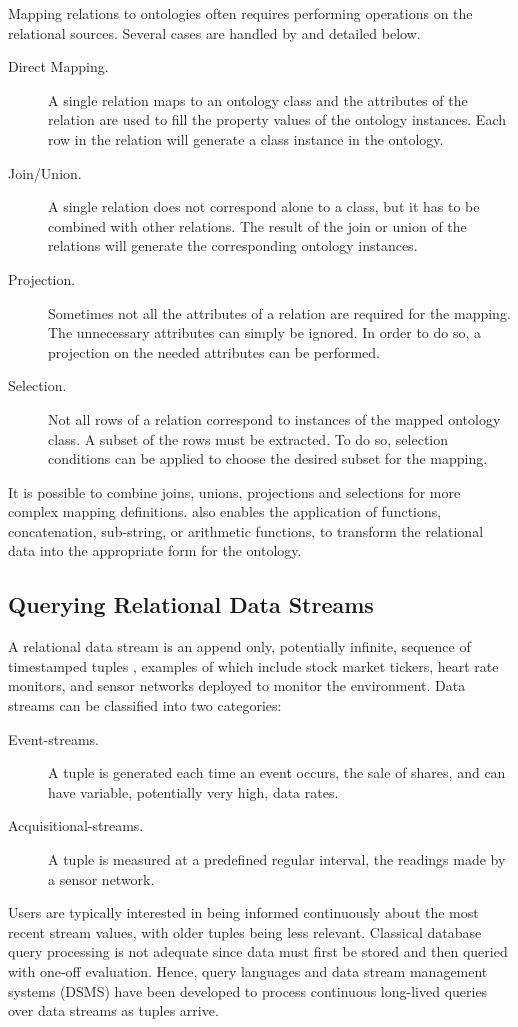 Mapping relations to ontologies often requires performing operations on the relational sources. 
Several cases are handled by \rtwoo and detailed below.
\begin{description}
\item[Direct Mapping.] A single relation maps to an ontology class and the attributes of the relation are used to fill the property values of the ontology instances. Each row in the relation will generate a class instance in the ontology.
\item[Join/Union.] A single relation does not correspond alone to a class, but it has to be combined with other relations. The result of the join or union of the relations will generate the corresponding ontology instances.
\item[Projection.] Sometimes not all the attributes of a relation are required for the mapping. The unnecessary attributes can simply be ignored. In order to do so, a projection on the needed attributes can be performed.
\item[Selection.] Not all rows of a relation correspond to instances of the mapped ontology class. A subset of the rows must be extracted. To do so, selection conditions can be applied to choose the desired subset for the mapping.
\end{description}
It is possible to combine joins, unions, projections and selections for more complex mapping definitions.
\rtwoo also enables the application of functions, \eg concatenation, sub-string, or arithmetic functions, to transform the relational data into the appropriate form for the ontology.



\subsection{Querying Relational Data Streams}
\label{sec:query-relat-streams}

A relational data stream is an append only, potentially infinite, sequence of timestamped tuples \cite{Golab2003Issues-in-data-}, examples of which include stock market tickers, heart rate monitors, and sensor networks deployed to monitor the environment.
Data streams can be classified into two categories:
\begin{description}
\item[Event-streams.] A tuple is generated each time an event occurs, \eg the sale of shares, and can have variable, potentially very high, data rates.
\item[Acquisitional-streams.] A tuple is measured at a predefined regular interval, \eg the readings made by a sensor network.
\end{description}
Users are typically interested in being informed continuously about the most recent stream values, with older tuples being less relevant.
Classical database query processing is not adequate since data must first be stored and then queried with one-off evaluation.
Hence, query languages \cite{Brenninkmeijer_08,Arasu_2006} and data stream management systems (DSMS) \cite{Arasu_06a,Abadi_2005,Galpin_09,Madden_05} have been developed to process continuous long-lived queries over data streams as tuples arrive.

